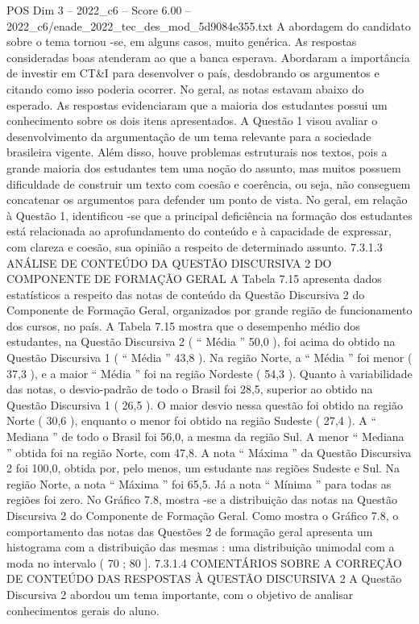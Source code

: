 \begin{textsample}{POS Dim 3 – 2022\_c6 – Score 6.00 – 2022\_c6/enade\_2022\_tec\_des\_mod\_5d9084e355.txt}
A abordagem do candidato sobre o tema tornou -se, em alguns casos, muito genérica.
As respostas consideradas boas atenderam ao que a banca esperava.
Abordaram a importância de investir em CT\&I para desenvolver o país, desdobrando os argumentos e citando como isso poderia ocorrer.
No geral, as notas estavam abaixo do esperado.
As respostas evidenciaram que a maioria dos estudantes possui um conhecimento sobre os dois itens apresentados.
A Questão 1 visou avaliar o desenvolvimento da argumentação de um tema relevante para a sociedade brasileira vigente.
Além disso, houve problemas estruturais nos textos, pois a grande maioria dos estudantes tem uma noção do assunto, mas muitos possuem dificuldade de construir um texto com coesão e coerência, ou seja, não conseguem concatenar os argumentos para defender um ponto de vista.
No geral, em relação à Questão 1, identificou -se que a principal deficiência na formação dos estudantes está relacionada ao aprofundamento do conteúdo e à capacidade de expressar, com clareza e coesão, sua opinião a respeito de determinado assunto. 7.3.1.3 ANÁLISE DE CONTEÚDO DA QUESTÃO DISCURSIVA 2 DO COMPONENTE DE FORMAÇÃO GERAL A Tabela 7.15 apresenta dados estatísticos a respeito das notas de conteúdo da Questão Discursiva 2 do Componente de Formação Geral, organizados por grande região de funcionamento dos cursos, no país.
A Tabela 7.15 mostra que o desempenho médio dos estudantes, na Questão Discursiva 2 ( “ Média ” 50,0 ), foi acima do obtido na Questão Discursiva 1 ( “ Média ” 43,8 ).
Na região Norte, a “ Média ” foi menor ( 37,3 ), e a maior “ Média ” foi na região Nordeste ( 54,3 ).
Quanto à variabilidade das notas, o desvio-padrão de todo o Brasil foi 28,5, superior ao obtido na Questão Discursiva 1 ( 26,5 ).
O maior desvio nessa questão foi obtido na região Norte ( 30,6 ), enquanto o menor foi obtido na região Sudeste ( 27,4 ).
A “ Mediana ” de todo o Brasil foi 56,0, a mesma da região Sul.
A menor “ Mediana ” obtida foi na região Norte, com 47,8.
A nota “ Máxima ” da Questão Discursiva 2 foi 100,0, obtida por, pelo menos, um estudante nas regiões Sudeste e Sul.
Na região Norte, a nota “ Máxima ” foi 65,5.
Já a nota “ Mínima ” para todas as regiões foi zero.
No Gráfico 7.8, mostra -se a distribuição das notas na Questão Discursiva 2 do Componente de Formação Geral.
Como mostra o Gráfico 7.8, o comportamento das notas das Questões 2 de formação geral apresenta um histograma com a distribuição das mesmas : uma distribuição unimodal com a moda no intervalo ( 70 ; 80 ]. 7.3.1.4 COMENTÁRIOS SOBRE A CORREÇÃO DE CONTEÚDO DAS RESPOSTAS À QUESTÃO DISCURSIVA 2 A Questão Discursiva 2 abordou um tema importante, com o objetivo de analisar conhecimentos gerais do aluno.

\end{textsample}
